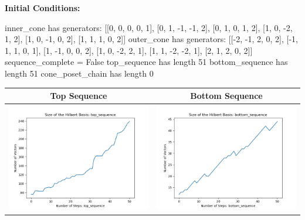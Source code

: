 \documentclass[10pt]{article}
\begin{document}
\textbf{Initial Conditions:}
\begin{SAGE}
inner_cone has generators: 
[[0, 0, 0, 0, 1], [0, 1, -1, -1, 2], [0, 1, 0, 1, 2], [1, 0, -2, 1, 2], [1, 0, -1, 0, 2], [1, 1, 1, 0, 2]]
outer_cone has generators: 
[[-2, -1, 2, 0, 2], [-1, 1, 1, 0, 1], [1, -1, 0, 0, 2], [1, 0, -2, 2, 1], [1, 1, -2, -2, 1], [2, 1, 2, 0, 2]]
	sequence_complete = False
	top_sequence has length 51
	bottom_sequence has length 51
	cone_poset_chain has length 0

\end{SAGE}
\begin{tabular}{c|c}
\textbf{Top Sequence} & \textbf{Bottom Sequence} \\ \hline 
\begin{minipage}{.45\textwidth}
\includegraphics[width=\textwidth]{"DATA/5d/6 generators 2 bound F alternating/top_sequence SIZE"}
\end{minipage} &
\begin{minipage}{.45\textwidth}
\includegraphics[width=\textwidth]{"DATA/5d/6 generators 2 bound F alternating/bottom_sequence SIZE"}

\end{minipage}
\end{tabular}
\end{document}
